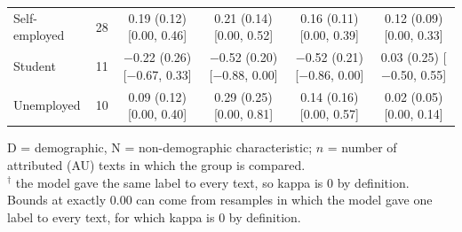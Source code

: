 \begin{table}[t]
\begin{tabular}{@{}lr*{4}{c}@{}}
\quad Self-employed & 28 & \makecell{0.19 (0.12)\\ {[}0.00, 0.46{]}} & \makecell{0.21 (0.14)\\ {[}0.00, 0.52{]}} & \makecell{0.16 (0.11)\\ {[}0.00, 0.39{]}} & \makecell{0.12 (0.09)\\ {[}0.00, 0.33{]}} \\
\quad Student & 11 & \makecell{$-$0.22 (0.26)\\ {[}$-$0.67, 0.33{]}} & \makecell{$-$0.52 (0.20)\\ {[}$-$0.88, 0.00{]}} & \makecell{$-$0.52 (0.21)\\ {[}$-$0.86, 0.00{]}} & \makecell{0.03 (0.25)\\ {[}$-$0.50, 0.55{]}} \\
\quad Unemployed & 10 & \makecell{0.09 (0.12)\\ {[}0.00, 0.40{]}} & \makecell{0.29 (0.25)\\ {[}0.00, 0.81{]}} & \makecell{0.14 (0.16)\\ {[}0.00, 0.57{]}} & \makecell{0.02 (0.05)\\ {[}0.00, 0.14{]}} \\
\bottomrule
\end{tabular}
\par\smallskip
\begin{minipage}{\linewidth}
\footnotesize
D = demographic, N = non-demographic characteristic; $n$ = number of attributed (\ac{AU}) texts in which the group is compared. \\
$^\dagger$ the model gave the same label to every text, so kappa is 0 by definition. \\
Bounds at exactly 0.00 can come from resamples in which the model gave one label to every text, for which kappa is 0 by definition.
\end{minipage}
\end{table}
